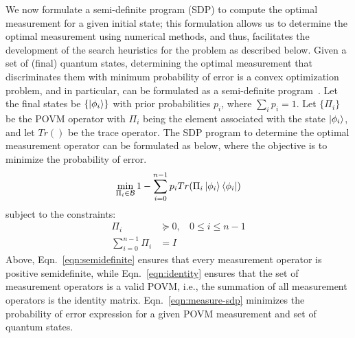 We now formulate a 
semi-definite program (SDP) to compute the optimal measurement 
for a given initial state; this formulation allows us to determine the optimal measurement 
using numerical methods, and thus, facilitates the development of the
search heuristics for the \iso problem as described below.
Given a set of (final) quantum states, determining the optimal measurement that
discriminates them with minimum probability of error is a convex optimization problem, and in particular, can be formulated as a semi-definite program~\cite{semidefinite}.
Let the final states be $\{\ket{\phi_i}\}$ with
prior 
probabilities $p_{i}$, where $\sum_i p_i = 1$.
Let $\{\Pi_{i}\}$ be the POVM operator with $\Pi_{i}$ being the element associated with the state $\ket{\phi_i}$, and let $Tr()$ be the trace operator.
The SDP program to determine the optimal measurement operator can be formulated
as below, where the objective is to minimize the probability of error.
\begin{equation}
    \min_{\Pi_{i} \in \mathcal{B}} 1 - \sum_{i=0}^{n-1} p_{i} Tr(\Pi_{i} \ket{\phi_i}\bra{\phi_i} )
    \label{eqn:measure-sdp}
\end{equation}
subject to the constraints:
\begin{align}
    \Pi_{i} & \succeq 0, \ \ \ \   0 \leq i \leq n-1 \label{eqn:semidefinite} \\
    \sum_{i=0}^{n-1} \Pi_{i} &= I \label{eqn:identity}
\end{align}
Above, Eqn.~\ref{eqn:semidefinite} ensures that every measurement operator is positive semidefinite, while Eqn.~\ref{eqn:identity} ensures that the set of measurement operators is a valid POVM, i.e., the summation of all measurement operators is the identity matrix.
Eqn.~\ref{eqn:measure-sdp} minimizes the probability of error expression for a given POVM measurement and set of quantum states.


